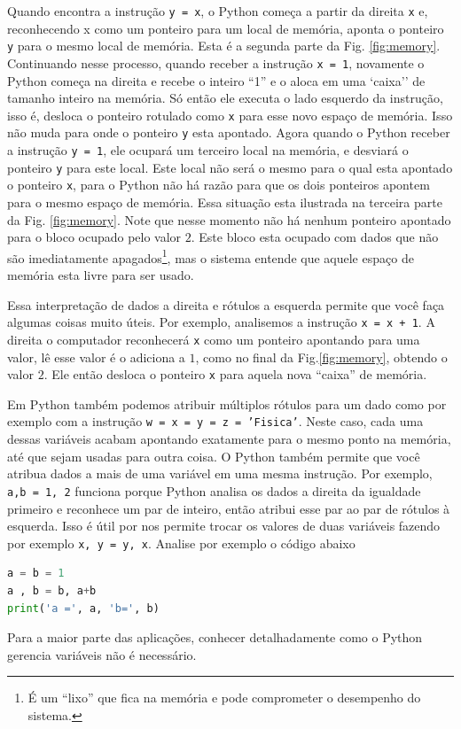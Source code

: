 Quando encontra a instrução {\tt y = x}, o Python começa a partir da
direita {\tt x} e, reconhecendo x como um ponteiro para um local de memória, aponta o ponteiro {\tt y} para o mesmo local de memória. Esta é a segunda parte da Fig. \ref{fig:memory}. Continuando nesse processo, quando receber a instrução {\tt x = 1}, novamente o Python começa na direita e recebe o inteiro ``1'' e o aloca em uma `caixa'' de tamanho inteiro na memória. Só então ele executa o lado esquerdo da instrução, isso é, desloca o ponteiro rotulado como {\tt x} para esse novo espaço de memória. Isso não muda para onde o ponteiro {\tt y} esta apontado. Agora quando o Python receber a instrução {\tt y = 1}, ele ocupará um terceiro local na memória, e desviará o ponteiro {\tt y} para este local. Este local não será o mesmo para o qual esta apontado o ponteiro {\tt x}, para o Python não há razão para que os dois ponteiros apontem para o mesmo espaço de memória. Essa situação esta ilustrada na terceira parte da Fig. \ref{fig:memory}. Note que nesse momento não há nenhum ponteiro apontado para o bloco ocupado pelo valor $2$. Este bloco esta ocupado com dados que não são imediatamente apagados\footnote{É um ``lixo'' que fica na memória e pode comprometer o desempenho do sistema.}, mas o sistema entende que aquele espaço de memória esta livre para ser usado.

Essa interpretação de dados a direita e rótulos a esquerda permite que você faça algumas coisas muito úteis. Por exemplo, analisemos a instrução {\tt x = x + 1}. A direita o computador reconhecerá {\tt x} como um ponteiro apontando para uma valor, lê esse valor é o adiciona a $1$, como no final da Fig.\ref{fig:memory}, obtendo o valor $2$. Ele então desloca o ponteiro {\tt x} para aquela  nova ``caixa'' de memória.

Em Python também podemos atribuir múltiplos rótulos para um dado como por exemplo com a instrução {\tt w = x = y = z = 'Fisica'}. Neste caso, cada uma dessas variáveis
acabam apontando exatamente para o mesmo ponto na memória, até que sejam usadas para
outra coisa. O Python também permite que você atribua dados a mais de uma variável em uma mesma instrução. Por exemplo, {\tt a,b = 1, 2} funciona porque Python analisa os dados a direita da igualdade primeiro e reconhece um par de inteiro, então atribui esse par ao par de rótulos à esquerda. Isso é útil por nos permite trocar os valores de duas variáveis fazendo por exemplo {\tt x, y = y, x}. Analise por exemplo o código abaixo
\begin{lstlisting}[language=Python]
a = b = 1
a , b = b, a+b
print('a =', a, 'b=', b)
\end{lstlisting}
Para a maior parte das aplicações, conhecer detalhadamente como o Python gerencia variáveis não é necessário.


